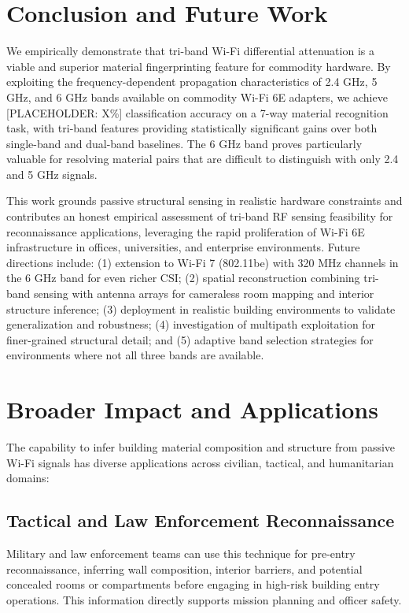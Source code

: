 \documentclass[conference]{IEEEtran}
\begin{document}
\section{Conclusion and Future Work}

We empirically demonstrate that tri-band Wi-Fi differential attenuation is a viable and superior material fingerprinting feature for commodity hardware. By exploiting the frequency-dependent propagation characteristics of 2.4 GHz, 5 GHz, and 6 GHz bands available on commodity Wi-Fi 6E adapters, we achieve [PLACEHOLDER: X\%] classification accuracy on a 7-way material recognition task, with tri-band features providing statistically significant gains over both single-band and dual-band baselines. The 6 GHz band proves particularly valuable for resolving material pairs that are difficult to distinguish with only 2.4 and 5 GHz signals.

This work grounds passive structural sensing in realistic hardware constraints and contributes an honest empirical assessment of tri-band RF sensing feasibility for reconnaissance applications, leveraging the rapid proliferation of Wi-Fi 6E infrastructure in offices, universities, and enterprise environments. Future directions include: (1) extension to Wi-Fi 7 (802.11be) with 320 MHz channels in the 6 GHz band for even richer CSI; (2) spatial reconstruction combining tri-band sensing with antenna arrays for cameraless room mapping and interior structure inference; (3) deployment in realistic building environments to validate generalization and robustness; (4) investigation of multipath exploitation for finer-grained structural detail; and (5) adaptive band selection strategies for environments where not all three bands are available.

\section*{Broader Impact and Applications}

The capability to infer building material composition and structure from passive Wi-Fi signals has diverse applications across civilian, tactical, and humanitarian domains:

\subsection*{Tactical and Law Enforcement Reconnaissance}
Military and law enforcement teams can use this technique for pre-entry reconnaissance, inferring wall composition, interior barriers, and potential concealed rooms or compartments before engaging in high-risk building entry operations. This information directly supports mission planning and officer safety.
\end{document}
